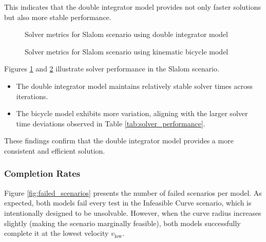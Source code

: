 This indicates that the double integrator model provides not only faster solutions but also more stable performance.

\begin{figure}[h!]
	\centering
	\caption{Solver metrics for Slalom scenario using double integrator model}
	\label{fig:slalom_point_mass_model}
\end{figure}

\begin{figure}[h!]
	\centering
	\caption{Solver metrics for Slalom scenario using kinematic bicycle model}
	\label{fig:slalom_bicycle_model}
\end{figure}

Figures \ref{fig:slalom_point_mass_model} and \ref{fig:slalom_bicycle_model} illustrate solver performance in the Slalom scenario.
\begin{itemize}
	\item The double integrator model maintains relatively stable solver times across iterations.
	\item The bicycle model exhibits more variation, aligning with the larger solver time deviations observed in Table \ref{tab:solver_performance}.
\end{itemize}

These findings confirm that the double integrator model provides a more consistent and efficient solution.

\subsubsection{Completion Rates}

Figure \ref{fig:failed_scenarios} presents the number of failed scenarios per model.
As expected, both models fail every test in the Infeasible Curve scenario, which is intentionally designed to be unsolvable.
However, when the curve radius increases slightly (making the scenario marginally feasible), both models successfully complete it at the lowest
velocity $v_{\text{low}}$.

